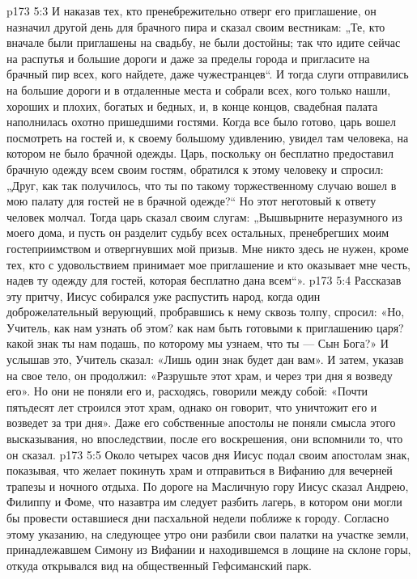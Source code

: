 \vs p173 5:3 И наказав тех, кто пренебрежительно отверг его приглашение, он назначил другой день для брачного пира и сказал своим вестникам: „Те, кто вначале были приглашены на свадьбу, не были достойны; так что идите сейчас на распутья и большие дороги и даже за пределы города и пригласите на брачный пир всех, кого найдете, даже чужестранцев“. И тогда слуги отправились на большие дороги и в отдаленные места и собрали всех, кого только нашли, хороших и плохих, богатых и бедных, и, в конце концов, свадебная палата наполнилась охотно пришедшими гостями. Когда все было готово, царь вошел посмотреть на гостей и, к своему большому удивлению, увидел там человека, на котором не было брачной одежды. Царь, поскольку он бесплатно предоставил брачную одежду всем своим гостям, обратился к этому человеку и спросил: „Друг, как так получилось, что ты по такому торжественному случаю вошел в мою палату для гостей не в брачной одежде?“ Но этот неготовый к ответу человек молчал. Тогда царь сказал своим слугам: „Вышвырните неразумного из моего дома, и пусть он разделит судьбу всех остальных, пренебрегших моим гостеприимством и отвергнувших мой призыв. Мне никто здесь не нужен, кроме тех, кто с удовольствием принимает мое приглашение и кто оказывает мне честь, надев ту одежду для гостей, которая бесплатно дана всем“».
\vs p173 5:4 \pc Рассказав эту притчу, Иисус собирался уже распустить народ, когда один доброжелательный верующий, пробравшись к нему сквозь толпу, спросил: «Но, Учитель, как нам узнать об этом? как нам быть готовыми к приглашению царя? какой знак ты нам подашь, по которому мы узнаем, что ты --- Сын Бога?» И услышав это, Учитель сказал: «Лишь один знак будет дан вам». И затем, указав на свое тело, он продолжил: «Разрушьте этот храм, и через три дня я возведу его». Но они не поняли его и, расходясь, говорили между собой: «Почти пятьдесят лет строился этот храм, однако он говорит, что уничтожит его и возведет за три дня». Даже его собственные апостолы не поняли смысла этого высказывания, но впоследствии, после его воскрешения, они вспомнили то, что он сказал.
\vs p173 5:5 Около четырех часов дня Иисус подал своим апостолам знак, показывая, что желает покинуть храм и отправиться в Вифанию для вечерней трапезы и ночного отдыха. По дороге на Масличную гору Иисус сказал Андрею, Филиппу и Фоме, что назавтра им следует разбить лагерь, в котором они могли бы провести оставшиеся дни пасхальной недели поближе к городу. Согласно этому указанию, на следующее утро они разбили свои палатки на участке земли, принадлежавшем Симону из Вифании и находившемся в лощине на склоне горы, откуда открывался вид на общественный Гефсиманский парк.
